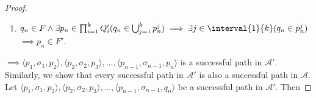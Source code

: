 \begin{proof}
\begin{enumerate}
			$q_i \in \bigcup_{j=1}^k{p_i^j}$. We have
			$p_{i+1} = \langle \delta_1(p_i, \sigma_i),$\\
			$\delta_2(p_i, \sigma_i), \ldots, \delta_k(p_i, \sigma_i)
			\rangle$ where $p_{i+1}^j = (\hat{\Delta}(
			p_i^j, \{ \sigma_i \}) \cap P_j) \cup$\\
			$(\bigcup_{r = 1, r
			\neq j}^k{\hat{\Delta}(p_i^r, \{ \sigma_i \}) \cap X})
			= (\hat{\Delta}(p_i^j, \{ \sigma_i \}) \cap P_j) \cup$\\
			$(\bigcup_{r = 1, r \neq j}^k{\hat{\Delta}(p_i^r, \{
			\sigma_i \}) \cap P_j}) = \bigcup_{r = 1}^k{\hat{\Delta}(
			p_i^r, \{ \sigma_i \}) \cap P_j}$ for $j \in
			\interval{1}{k}$. Then $q_{i+1} \in \Delta(q_i,
			\sigma_i) \implies q_{i+1} \in \bigcup_{r=1}^k{
			\hat{\Delta}(p_i^r, \{ \sigma_i \})}\\
			\implies q_{i+1} \in \bigcup_{j=1}^k{\bigcup_{r=1}^k{
			\hat{\Delta}(p_i^r, \{ \sigma_i \}) \cap P_j}}
			\implies q_{i+1} \in \bigcup_{j=1}^k{p_{i+1}^j}$;
		\item $q_n \in F \land \exists p_n \in \prod_{i=1}^k{Q_i'}
			(q_n \in \bigcup_{j=1}^k{p_n^j})
			\implies \exists j \in \interval{1}{k}(q_n \in p_n^j)$\\
			$\implies p_n \in F'$.
	\end{enumerate}
	\bigbreak
	\noindent
	$\implies \langle p_1, \sigma_1, p_2 \rangle, \langle p_2, \sigma_2,
	p_3 \rangle, \ldots, \langle p_{n-1}, \sigma_{n-1}, p_n \rangle$ is a
	successful path in $\mathcal{A'}$.
	\bigbreak
	\noindent
	Similarly, we show that every successful path in $\mathcal{A'}$ is also a
	successful path in $\mathcal{A}$. Let $\langle p_1, \sigma_1, p_2
	\rangle, \langle p_2, \sigma_2, p_3 \rangle, \ldots, \langle p_{n-1},
	\sigma_{n-1}, q_n \rangle$ be a successful path in $\mathcal{A'}$. Then
\end{proof}
